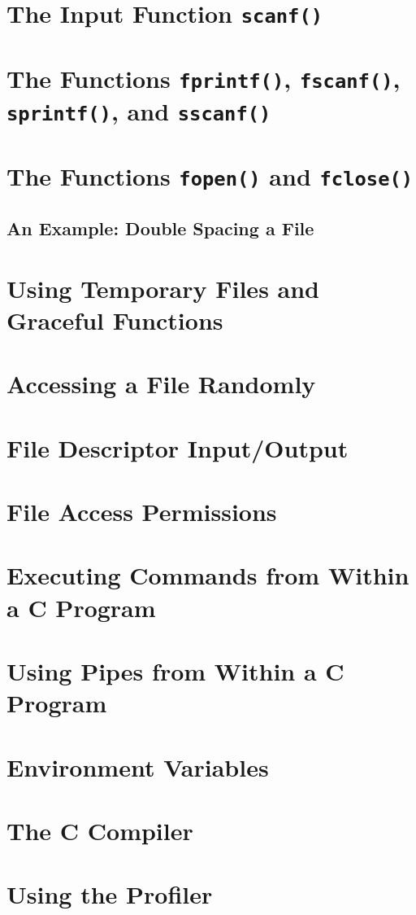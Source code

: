 \documentclass{article}
\begin{document}
\section{The Input Function \texttt{scanf()}}
\section{The Functions \texttt{fprintf()}, \texttt{fscanf()}, \texttt{sprintf()}, and \texttt{sscanf()}}
\section{The Functions \texttt{fopen()} and \texttt{fclose()}}
\subsection{An Example: Double Spacing a File}
\section{Using Temporary Files and Graceful Functions}
\section{Accessing a File Randomly}
\section{File Descriptor Input/Output}
\section{File Access Permissions}
\section{Executing Commands from Within a C Program}
\section{Using Pipes from Within a C Program}
\section{Environment Variables}
\section{The C Compiler}
\section{Using the Profiler}
\end{document}

